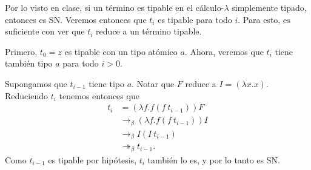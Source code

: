 \documentclass{article}
\begin{document}
Por lo visto en clase, si un término es tipable en el cálculo-$\lambda$ simplemente tipado, entonces es SN. Veremos entonces que $t_i$ es tipable para todo $i$. Para esto, es suficiente con ver que $t_i$ reduce a un término tipable.

Primero, $t_0 = z$ es tipable con un tipo atómico $a$. Ahora, veremos que $t_i$ tiene también tipo $a$ para todo $i > 0$.

Supongamos que $t_{i-1}$ tiene tipo $a$. Notar que $F$ reduce a $I = (\lambda x.x)$. Reduciendo $t_i$ tenemos entonces que
\begin{align*}
    t_i &= (\lambda f. f (f\ t_{i-1})) F\\
    &\rightarrow_\beta (\lambda f. f (f\ t_{i-1})) I\\
    &\rightarrow_\beta I (I\ t_{i-1})\\
    &\twoheadrightarrow_\beta t_{i-1}.
\end{align*}
Como $t_{i-1}$ es tipable por hipótesis, $t_i$ también lo es, y por lo tanto es SN.
\end{document}
